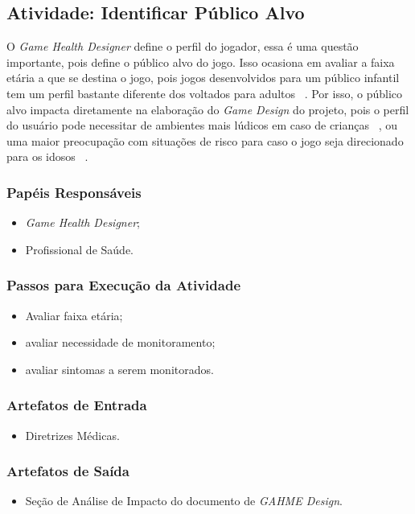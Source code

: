 \subsection{Atividade: Identificar Público Alvo}
O \textit{Game Health Designer} define o perfil do jogador, essa é uma questão importante, pois define o público alvo do jogo. Isso ocasiona em avaliar a faixa etária a que se destina o jogo, pois jogos desenvolvidos para um público infantil tem um perfil bastante diferente dos voltados para adultos ~\cite{brathwaite2009challenges}. Por isso, o público alvo impacta diretamente na elaboração do \textit{Game Design} do projeto, pois o perfil do usuário pode necessitar de ambientes mais lúdicos em caso de crianças ~\cite{yannakakis06}, ou uma maior preocupação com situações de risco para caso o jogo seja direcionado para os idosos ~\cite{brox11,arntzen2011}.


\subsubsection{Papéis Responsáveis}
\begin{itemize}
	\item \textit{Game Health Designer};
	\item Profissional de Saúde.
\end{itemize}

\subsubsection{Passos para Execução da Atividade}
\begin{itemize}
	\item Avaliar faixa etária;
	\item avaliar necessidade de monitoramento;
	\item avaliar sintomas a serem monitorados.
\end{itemize}

\subsubsection{Artefatos de Entrada}
\begin{itemize}
	\item Diretrizes Médicas.
\end{itemize}

\subsubsection{Artefatos de Saída}
\begin{itemize}
	\item Seção de Análise de Impacto do documento de \textit{GAHME Design}.
\end{itemize}


